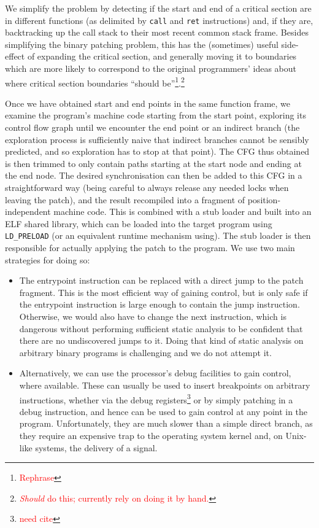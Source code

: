 \documentclass[10pt,twocolumn,preprint,natbib,authoryear]{sigplanconf}
\newcommand{\editorial}[1]{\textcolor{red}{\footnote{\textcolor{red}{#1}}}}
\newcommand{\needCite}{\editorial{need cite}}
\begin{document}
We simplify the problem by detecting if the start and end of a
critical section are in different functions (as delimited by
\verb|call| and \verb|ret| instructions) and, if they are,
backtracking up the call stack to their most recent common stack
frame.  Besides simplifying the binary patching problem, this has the
(sometimes) useful side-effect of expanding the critical section, and
generally moving it to boundaries which are more likely to correspond
to the original programmers' ideas about where critical section
boundaries ``should be''\editorial{Rephrase}.\editorial{\emph{Should}
  do this; currently rely on doing it by hand.}

Once we have obtained start and end points in the same function frame,
we examine the program's machine code starting from the start point,
exploring its control flow graph until we encounter the end point or
an indirect branch (the exploration process is sufficiently naive that
indirect branches cannot be sensibly predicted, and so exploration has
to stop at that point).  The CFG thus obtained is then trimmed to only
contain paths starting at the start node and ending at the end node.
The desired synchronisation can then be added to this CFG in a
straightforward way (being careful to always release any needed locks
when leaving the patch), and the result recompiled into a fragment of
position-independent machine code.  This is combined with a stub
loader and built into an ELF shared library, which can be loaded into
the target program using \verb|LD_PRELOAD| (or an equivalent runtime
mechanism using).  The stub loader is then responsible for actually
applying the patch to the program.  We use two main strategies for
doing so:

\begin{itemize}
\item The entrypoint instruction can be replaced with a direct jump to
  the patch fragment.  This is the most efficient way of gaining
  control, but is only safe if the entrypoint instruction is large
  enough to contain the jump instruction.  Otherwise, we would also
  have to change the next instruction, which is dangerous without
  performing sufficient static analysis to be confident that there are
  no undiscovered jumps to it.  Doing that kind of static analysis on
  arbitrary binary programs is challenging and we do not attempt it.

\item Alternatively, we can use the processor's debug facilities to
  gain control, where available.  These can usually be used to insert
  breakpoints on arbitrary instructions, whether via the debug
  registers\needCite{} or by simply patching in a debug instruction,
  and hence can be used to gain control at any point in the program.
  Unfortunately, they are much slower than a simple direct branch, as
  they require an expensive trap to the operating system kernel and,
  on Unix-like systems, the delivery of a signal.
\end{itemize}
\end{document}
